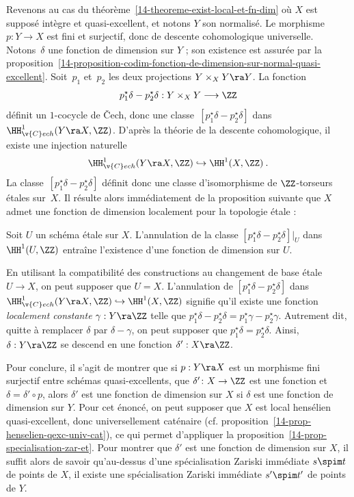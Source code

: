 \documentclass[10pt]{../fichiers-configuration-latex/smfart}
\begin{document}
\medskip

Revenons au cas du théorème~\ref{14-theoreme-exist-local-et-fn-dim} où $X$ est supposé intègre et
quasi-excellent, et notons $Y$ son normalisé. Le morphisme $p : Y \rightarrow  X$ est fini et
surjectif, donc de descente cohomologique universelle. Notons~$\delta$ une fonction de dimension sur
$Y$ ; son existence est assurée par la
proposition~\ref{14-proposition-codim-fonction-de-dimension-sur-normal-quasi-excellent}. Soit~$p_1$
et~$p_2$ les deux projections $Y\times_X Y \ra Y$. La fonction $$p_1^\star \delta -p_2^\star\delta :
Y\times_X Y \longrightarrow \ZZ$$ définit un $1$-cocycle de Čech, donc une classe~$[p_1^\star
\delta -p_2^\star\delta]$ dans $\HH^1_{\v{C}ech}(Y \ra X, \ZZ)$.  D'après la théorie de la descente
cohomologique, il existe une injection naturelle $$\HH^1_{\v{C}ech}(Y \ra X, \ZZ) \hookrightarrow
\HH^1(X,\ZZ)\:.$$ La classe~$[p_1^\star \delta -p_2^\star\delta]$ définit donc une classe
d'isomorphisme de $\ZZ$-torseurs étales sur~$X$. Il résulte alors immédiatement de la proposition
suivante que $X$ admet une fonction de dimension localement pour la topologie étale :

\begin{proposition2} Soit $U$ un schéma étale sur $X$. L'annulation de la classe $[p_1^\star \delta
-p_2^\star\delta]\vert_U$ dans $\HH^1(U,\ZZ)$ entraîne l'existence d'une fonction de dimension sur
$U$.  \end{proposition2}

\begin{démo} En utilisant la compatibilité des constructions au changement de base étale $U\to X$,
on peut supposer que $U=X$.  L'annulation de $[p_1^\star \delta -p_2^\star\delta]$ dans
$\HH^1_{\v{C}ech}(Y \ra X,\ZZ) \hookrightarrow \HH^1(X,\ZZ)$ signifie qu'il existe une fonction
\emph{localement constante} $\gamma: Y \ra \ZZ$ telle que $p_1^\star \delta-p_2^\star
\delta=p_1^\star \gamma-p_2^\star \gamma$. Autrement dit, quitte à remplacer $\delta$ par
$\delta-\gamma$, on peut supposer que $p_1^\star \delta=p_2^\star \delta$. Ainsi, $\delta:Y\ra \ZZ$
se descend en une fonction $\delta':X\ra \ZZ $.

Pour conclure, il s'agit de montrer que si $p: Y\ra X$ est un morphisme fini surjectif entre schémas
quasi-excellents, que $\delta'\colon X\to \ZZ$ est une fonction et $\delta=\delta'\circ p$, alors
$\delta'$ est une fonction de dimension sur $X$ si $\delta$ est une fonction de dimension sur $Y$.
Pour cet énoncé, on peut supposer que $X$ est local hensélien quasi-excellent, donc universellement
caténaire (cf.  proposition~\ref{14-prop-henselien-qexc-univ-cat}), ce qui permet d'appliquer la
proposition~\ref{14-prop-specialisation-zar-et}. Pour montrer que $\delta'$ est une fonction de
dimension sur $X$, il suffit alors de savoir qu'au-dessus d'une spécialisation Zariski immédiate
$s\spim t$ de points de $X$, il existe une spécialisation Zariski immédiate $s'\spim t'$ de points
de $Y$.  \end{démo}
\end{document}
